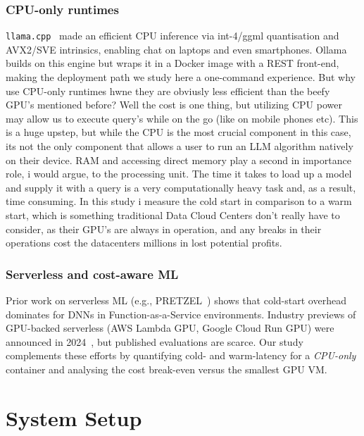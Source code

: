 \documentclass[conference]{IEEEtran}
\begin{document}
\subsubsection*{CPU-only runtimes}
\texttt{llama.cpp}~\cite{llamacpp} made an efficient CPU inference via int-4/ggml quantisation and AVX2/SVE intrinsics, enabling chat on laptops and even smartphones.
Ollama builds on this engine but wraps it in a Docker image with a REST front-end, making the deployment path we study here a one-command experience. But why use CPU-only runtimes hwne they are obviusly less efficient than the beefy GPU's mentioned before? Well the cost is one thing, but utilizing CPU power may allow us to execute query's while on the go (like on mobile phones etc). This is a huge upstep, but while the CPU is the most crucial component in this case, its not the only component that allows a user to run an LLM algorithm natively on their device. RAM and accessing direct memory play a second in importance role, i would argue, to the processing unit. The time it takes to load up a model and supply it with a query is a very computationally heavy task and, as a result, time consuming. In this study i measure the cold start in comparison to a warm start, which is something traditional Data Cloud Centers don't really have to consider, as their GPU's are always in operation, and any breaks in their operations cost the datacenters millions in lost potential profits.

\subsubsection*{Serverless and cost-aware ML}
Prior work on serverless ML (e.g., PRETZEL~\cite{pretzel}) shows that cold-start overhead dominates for DNNs in Function-as-a-Service environments.
Industry previews of GPU-backed serverless (AWS Lambda GPU, Google Cloud Run GPU) were announced in 2024~\cite{serverlessgpu}, but published evaluations are scarce.
Our study complements these efforts by quantifying cold- and warm-latency for a \emph{CPU-only} container and analysing the cost break-even versus the smallest GPU VM.
\section{System Setup}\label{sec:setup}
\end{document}
